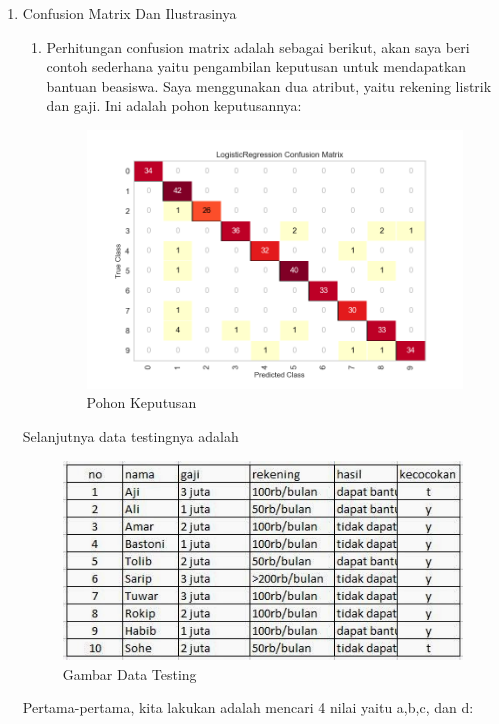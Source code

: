 \begin{enumerate}
\item Confusion Matrix Dan Ilustrasinya
\begin{enumerate}
\item Perhitungan confusion matrix adalah sebagai berikut, akan saya beri contoh sederhana yaitu pengambilan keputusan untuk mendapatkan bantuan beasiswa. Saya menggunakan dua atribut, yaitu rekening listrik dan gaji. Ini adalah pohon keputusannya:
\begin{figure}[ht]
\centering
\includegraphics[scale=0.5]{figures/c3jesron7.png}
\caption{Pohon Keputusan}
\label{contoh}
\end{figure}
\end{enumerate}

Selanjutnya data testingnya adalah

\begin{figure}[ht]
\centering
\includegraphics[scale=0.5]{figures/c3jesron8.jpg}
\caption{Gambar Data Testing}
\label{contoh}
\end{figure}

Pertama-pertama, kita lakukan adalah mencari 4 nilai yaitu a,b,c, dan d:


\end{enumerate}
